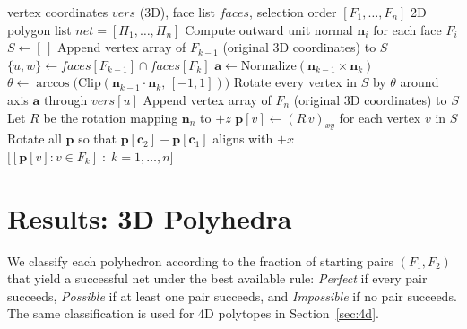 \documentclass[12pt]{article}
\theoremstyle{definition}
\begin{document}
\begin{algorithm}[htbp]
\caption{2D Net Construction (3D polyhedra)}
\label{alg:net2d}
\begin{algorithmic}[1]
\Require vertex coordinates $\mathit{vers}$ (3D), face list $\mathit{faces}$,
         selection order $[F_1,\ldots,F_n]$
\Ensure 2D polygon list $\mathit{net} = [\Pi_1,\ldots,\Pi_n]$
\State Compute outward unit normal $\mathbf{n}_i$ for each face $F_i$
       \hfill{}
\State $S \gets [\,]$ \hfill{}
  \State Append vertex array of $F_{k-1}$ (original 3D coordinates) to $S$
  \State $\{u,w\} \gets \mathit{faces}[F_{k-1}]\cap \mathit{faces}[F_k]$
         \hfill{}
  \State $\mathbf{a} \gets \mathrm{Normalize}(\mathbf{n}_{k-1}\times\mathbf{n}_k)$
         \hfill{}
  \State $\theta \gets \arccos\!\bigl(\mathrm{Clip}(\mathbf{n}_{k-1}\cdot\mathbf{n}_k,\,[-1,1])\bigr)$
         \hfill{}
  \State Rotate every vertex in $S$ by $\theta$ around axis $\mathbf{a}$ through $\mathit{vers}[u]$
         \hfill{}
\EndFor
\State Append vertex array of $F_n$ (original 3D coordinates) to $S$
\State Let $R$ be the rotation mapping $\mathbf{n}_n$ to $+z$
\State $\mathbf{p}[v] \gets (R\,v)_{xy}$ for each vertex $v$ in $S$
       \hfill{}
\State Rotate all $\mathbf{p}$ so that $\mathbf{p}[\mathbf{c}_2]-\mathbf{p}[\mathbf{c}_1]$
       aligns with $+x$
       \hfill{}
\State \Return $\bigl[[\mathbf{p}[v]:v\!\in\! F_k]\;:\;k=1,\ldots,n\bigr]$
\end{algorithmic}
\end{algorithm}

\section{Results: 3D Polyhedra}
\label{sec:3d}

We classify each polyhedron according to the fraction of starting pairs
$(F_1,F_2)$ that yield a successful net under the best available rule:
\emph{Perfect} if every pair succeeds,
\emph{Possible} if at least one pair succeeds, and
\emph{Impossible} if no pair succeeds.
The same classification is used for 4D polytopes in
Section~\ref{sec:4d}.
\end{document}
